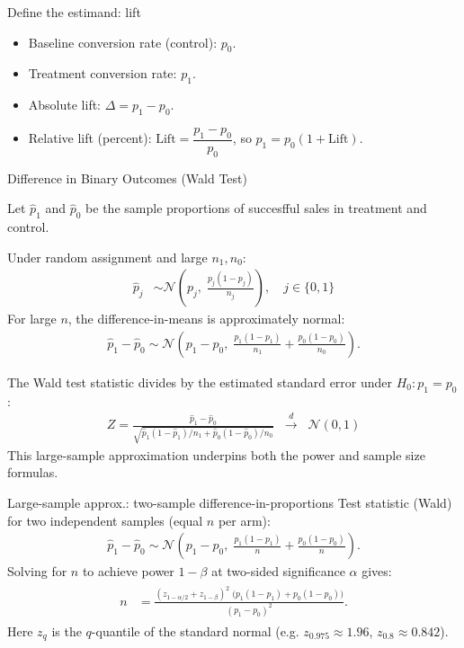 \documentclass[aspectratio=169,11pt]{beamer}
\begin{document}
\begin{frame}{Define the estimand: lift}
  \begin{itemize}
    \item Baseline conversion rate (control): $p_0$.
    \item Treatment conversion rate: $p_1$.
    \item Absolute lift: $\Delta = p_1 - p_0$.
    \item Relative lift (percent): $\text{Lift} = \dfrac{p_1 - p_0}{p_0}$, so $p_1 = p_0(1+\text{Lift})$.
  \end{itemize}
\end{frame}

\begin{frame}{Difference in Binary Outcomes (Wald Test)}

Let $\hat{p}_1$ and $\hat{p}_0$ be the sample proportions of succesfful sales in treatment and control.

Under random assignment and large $n_1, n_0$:
\begin{align*}
\hat{p}_j &\sim \mathcal{N}\!\left(p_j,\; \frac{p_j(1-p_j)}{n_j}\right), \quad j\in\{0,1\}
\end{align*}
For large $n$, the difference-in-means is approximately normal:
\begin{align*}
\hat{p}_1 - \hat{p}_0 
\sim \mathcal{N}\!\left(p_1 - p_0,\;
\frac{p_1(1-p_1)}{n_1} + \frac{p_0(1-p_0)}{n_0}\right).
\end{align*}

The Wald test statistic divides by the estimated standard error under $H_0: p_1 = p_0$:
\begin{align*}
Z = \frac{\hat{p}_1 - \hat{p}_0}
         {\sqrt{\hat{p}_1(1-\hat{p}_1)/n_1 + \hat{p}_0(1-\hat{p}_0)/n_0}}
\;\;\xrightarrow[]{d}\;\; \mathcal{N}(0,1)
\end{align*}
This large-sample approximation underpins both the \alert{power} and \alert{sample size} formulas.
\end{frame}


\begin{frame}{Large-sample approx.: two-sample difference-in-proportions}
  Test statistic (Wald) for two independent samples (equal $n$ per arm):
  \begin{align*}
    \hat{p}_1 - \hat{p}_0 \sim \mathcal{N}\!\left(p_1-p_0,\; \frac{p_1(1-p_1)}{n} + \frac{p_0(1-p_0)}{n}\right).
  \end{align*}
  Solving for $n$ to achieve power $1-\beta$ at two-sided significance $\alpha$ gives:
  \begin{align*}
  \begin{aligned}
    n &= \frac{(z_{1-\alpha/2} + z_{1-\beta})^2\;\big(p_1(1-p_1)+p_0(1-p_0)\big)}
               {(p_1-p_0)^2}.
  \end{aligned}
  \end{align*}
  Here $z_{q}$ is the $q$-quantile of the standard normal (e.g. $z_{0.975}\approx 1.96$, $z_{0.8}\approx 0.842$).
\end{frame}
\end{document}
